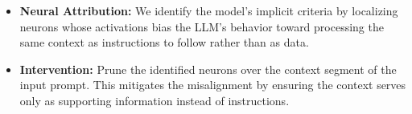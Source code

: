 \begin{itemize} \item \textbf{Neural Attribution:} We identify the model’s implicit criteria by localizing neurons whose activations bias the LLM’s behavior toward processing the same context as instructions  to follow rather than as data.
\item \textbf{Intervention:} Prune the identified neurons over the context segment of the input prompt. 
This mitigates the misalignment by ensuring the context serves only as supporting information instead of instructions.

\end{itemize}

